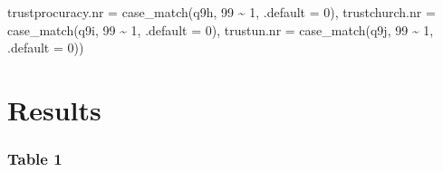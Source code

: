 \documentclass[
  letterpaper,
  DIV=11,
  numbers=noendperiod]{scrartcl}
\newenvironment{Shaded}{\begin{snugshade}}{\end{snugshade}}
\newcommand{\AttributeTok}[1]{\textcolor[rgb]{0.40,0.45,0.13}{#1}}
\newcommand{\DecValTok}[1]{\textcolor[rgb]{0.68,0.00,0.00}{#1}}
\newcommand{\FunctionTok}[1]{\textcolor[rgb]{0.28,0.35,0.67}{#1}}
\newcommand{\NormalTok}[1]{\textcolor[rgb]{0.00,0.23,0.31}{#1}}
\newcommand{\SpecialCharTok}[1]{\textcolor[rgb]{0.37,0.37,0.37}{#1}}
\begin{document}
\begin{Shaded}
\begin{Highlighting}[]
         \AttributeTok{trustprocuracy.nr =} \FunctionTok{case\_match}\NormalTok{(q9h, }\DecValTok{99} \SpecialCharTok{\textasciitilde{}} \DecValTok{1}\NormalTok{, }\AttributeTok{.default =} \DecValTok{0}\NormalTok{),}
         \AttributeTok{trustchurch.nr =} \FunctionTok{case\_match}\NormalTok{(q9i, }\DecValTok{99} \SpecialCharTok{\textasciitilde{}} \DecValTok{1}\NormalTok{, }\AttributeTok{.default =} \DecValTok{0}\NormalTok{),}
         \AttributeTok{trustun.nr =} \FunctionTok{case\_match}\NormalTok{(q9j, }\DecValTok{99} \SpecialCharTok{\textasciitilde{}} \DecValTok{1}\NormalTok{, }\AttributeTok{.default =} \DecValTok{0}\NormalTok{))}
\end{Highlighting}
\end{Shaded}

\section{Results}\label{results}

\subsubsection{Table 1}\label{table-1}
\end{document}
